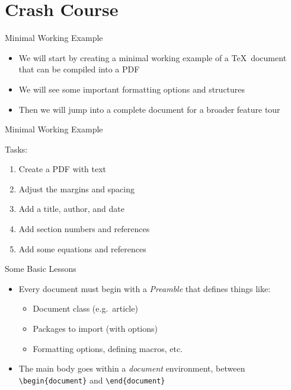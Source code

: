\documentclass{beamer} %
\begin{document}
\section{Crash Course}

\begin{frame}{Minimal Working Example}

\begin{itemize}
	\item We will start by creating a minimal working example of a \TeX\ document that can be compiled into a PDF
	\item We will see some important formatting options and structures
	\item Then we will jump into a complete document for a broader feature tour
\end{itemize}

\end{frame}

\begin{frame}{Minimal Working Example}

Tasks:
\begin{enumerate}
	\item Create a PDF with text
	\item Adjust the margins and spacing
	\item Add a title, author, and date
	\item Add section numbers and references
	\item Add some equations and references
\end{enumerate}

\end{frame}

\begin{frame}{Some Basic Lessons}

\begin{itemize}
	\item Every document must begin with a \textit{Preamble} that defines things like:
	\begin{itemize}
		\item Document class (e.g.~article)
		\item Packages to import (with options)
		\item Formatting options, defining macros, etc.
	\end{itemize}
	\item The main body goes within a \textit{document} environment, between {\tt \textbackslash begin\{document\}} and {\tt \textbackslash end\{document\}}
\end{itemize}

\end{frame}
\end{document}
